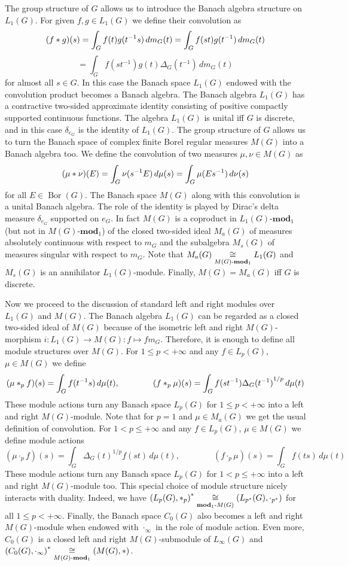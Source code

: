 The group structure of $G$ allows us to introduce the Banach algebra structure on
$L_1(G)$. For given $f,g\in L_1(G)$ we define their convolution as
\[
(f\ast g)(s)=\int_G f(t)g(t^{-1}s)\,dm_G(t)=\int_G f(st)g(t^{-1})\,dm_G(t)
\]
\[=\int_G f(st^{-1})g(t)\Delta_G(t^{-1})\,dm_G(t)
\]
for almost all $s\in G$. In this case the Banach space $L_1(G)$ endowed with 
the convolution product becomes a Banach algebra. The Banach algebra $L_1(G)$ has a 
contractive two-sided approximate identity consisting of positive compactly 
supported continuous functions. The algebra $L_1(G)$ is unital iff $G$ is 
discrete, and in this case $\delta_{e_G}$ is the identity of $L_1(G)$. 
The group structure of $G$ allows us to turn the Banach space of complex finite 
Borel regular measures $M(G)$ into a Banach algebra too. We define the 
convolution of two measures $\mu,\nu\in M(G)$ as
\[
(\mu\ast \nu)(E)=\int_G\nu(s^{-1}E)\,d\mu(s)=\int_G\mu(Es^{-1})\,d\nu(s)
\]
for all $E\in \operatorname{Bor}(G)$. The Banach space $M(G)$ along with this convolution is 
a unital Banach algebra. The role of the identity is played by Dirac's delta 
measure $\delta_{e_G}$ supported on $e_G$. In fact $M(G)$ is a coproduct 
in $L_1(G)\text{-}\mathbf{mod}_1$ (but not in $M(G)\text{-}\mathbf{mod}_1$) of the 
closed two-sided ideal $M_a(G)$ of measures absolutely continuous with 
respect to $m_G$ and  the subalgebra $M_s(G)$ of measures singular with 
respect to $m_G$. Note that $M_a(G)\mathrel{\mathop{\cong}\limits_{M(G)\text{-}\mathbf{mod}_1}}L_1(G)$ 
and $M_s(G)$ is an annihilator $L_1(G)$-module. 
Finally, $M(G)=M_a(G)$ iff $G$ is discrete. 

Now we proceed to the discussion of standard left and right modules 
over $L_1(G)$ and $M(G)$. The Banach algebra $L_1(G)$ can be 
regarded as a closed two-sided ideal  of $M(G)$ because of the isometric 
left and right $M(G)$-morphism $i:L_1(G)\to M(G):f\mapsto f m_G$. 
Therefore, it is enough to define all module structures over $M(G)$. 
For $1\leq p<+\infty$ and any $f\in L_p(G)$, $\mu\in M(G)$ we define
\[
(\mu\ast_p f)(s)=\int_G f(t^{-1}s)\,d\mu(t), \qquad\qquad (f\ast_p
\mu)(s)=\int_G f(st^{-1}){\Delta_G(t^{-1})}^{1/p}\,d\mu(t)
\]
These module actions turn any Banach space $L_p(G)$ for $1\leq p<+\infty$ into 
a left and right $M(G)$-module. Note that for $p=1$ and $\mu\in M_a(G)$ we 
get the usual definition of convolution. For $1<p\leq +\infty$ and 
any $f\in L_p(G)$, $\mu\in M(G)$ we define module actions
\[
(\mu\cdot_p f)(s)=\int_G {\Delta_G(t)}^{1/p}f(st)\,d\mu(t), \qquad\qquad (f\cdot_p
\mu)(s)=\int_G f(ts)\,d\mu(t)
\]
These module actions turn any Banach space $L_p(G)$ for $1<p\leq+\infty$ into 
a left and right $M(G)$-module too. This special choice of module structure 
nicely interacts with duality. Indeed, we have 
${(L_p(G),\ast_p)}^*\mathrel{\mathop{\cong}\limits_{\mathbf{mod}_1\text{-}M(G)}}(L_{p^*}(G),\cdot_{p^*})$ 
for all $1\leq p<+\infty$. Finally, the Banach space $C_0(G)$ also becomes a left 
and right $M(G)$-module when endowed with $\cdot_\infty$ in the role of module 
action. Even more, $C_0(G)$ is a closed left and right $M(G)$-submodule 
of $L_\infty(G)$ 
and ${(C_0(G),\cdot_\infty)}^*\mathrel{\mathop{\cong}\limits_{M(G)\text{-}\mathbf{mod}_1}}(M(G),\ast)$.

